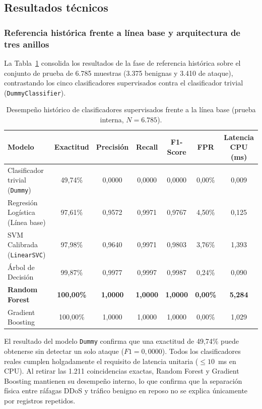 \documentclass[11pt,a4paper]{article}
\begin{document}
\subsection{Resultados técnicos}

\subsubsection{Referencia histórica frente a línea base y arquitectura de tres anillos}
La Tabla~\ref{tab:historico} consolida los resultados de la fase de referencia histórica sobre el conjunto de prueba de 6.785 muestras (3.375 benignas y 3.410 de ataque), contrastando los cinco clasificadores supervisados contra el clasificador trivial (\texttt{DummyClassifier}).

\begin{table}[H]
\centering\footnotesize
\caption{Desempeño histórico de clasificadores supervisados frente a la línea base (prueba interna, $N = 6.785$).}
\label{tab:historico}
\begin{tabularx}{\textwidth}{X c c c c c c}
\toprule
\textbf{Modelo} & \textbf{Exactitud} & \textbf{Precisión} & \textbf{Recall} & \textbf{F1-Score} & \textbf{FPR} & \textbf{Latencia CPU (ms)} \\
\midrule
Clasificador trivial (\texttt{Dummy}) & 49,74\% & 0,0000 & 0,0000 & 0,0000 & 0,00\% & 0,009 \\
Regresión Logística (Línea base) & 97,61\% & 0,9572 & 0,9971 & 0,9767 & 4,50\% & 0,125 \\
SVM Calibrada (\texttt{LinearSVC}) & 97,98\% & 0,9640 & 0,9971 & 0,9803 & 3,76\% & 1,393 \\
Árbol de Decisión & 99,87\% & 0,9977 & 0,9997 & 0,9987 & 0,24\% & 0,090 \\
\textbf{Random Forest} & \textbf{100,00\%} & \textbf{1,0000} & \textbf{1,0000} & \textbf{1,0000} & \textbf{0,00\%} & \textbf{5,284} \\
Gradient Boosting & 100,00\% & 1,0000 & 1,0000 & 1,0000 & 0,00\% & 1,029 \\
\bottomrule
\end{tabularx}
\end{table}

El resultado del modelo \texttt{Dummy} confirma que una exactitud de 49,74\% puede obtenerse sin detectar un solo ataque ($F1 = 0{,}0000$). Todos los clasificadores reales cumplen holgadamente el requisito de latencia unitaria ($\le 10$~ms en CPU). Al retirar las 1.211 coincidencias exactas, Random Forest y Gradient Boosting mantienen su desempeño interno, lo que confirma que la separación física entre ráfagas DDoS y tráfico benigno en reposo no se explica únicamente por registros repetidos.
\end{document}
